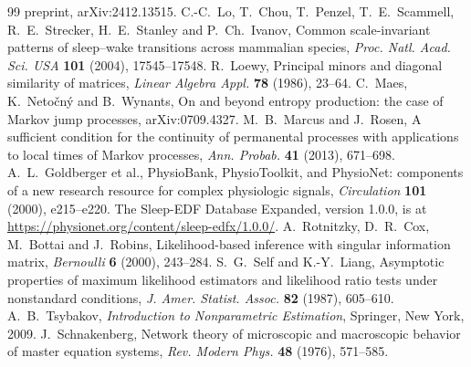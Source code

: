 \documentclass[11pt]{article}
\theoremstyle{definition}
\theoremstyle{remark}
\begin{document}
\begin{thebibliography}{99}
 preprint, arXiv:2412.13515.
 C.-C.~Lo, T.~Chou, T.~Penzel, T.~E.~Scammell, R.~E.~Strecker,
 H.~E.~Stanley and P.~Ch.~Ivanov, Common scale-invariant patterns of
 sleep--wake transitions across mammalian species, \emph{Proc. Natl. Acad. Sci.
 USA} \textbf{101} (2004), 17545--17548.
 R.~Loewy, Principal minors and diagonal similarity of
 matrices, \emph{Linear Algebra Appl.} \textbf{78} (1986), 23--64.
 C.~Maes, K.~Neto\v{c}n\'y and B.~Wynants, On and beyond
 entropy production: the case of Markov jump processes, arXiv:0709.4327.
 M.~B.~Marcus and J.~Rosen, A sufficient condition for the
 continuity of permanental processes with applications to local times of Markov
 processes, \emph{Ann. Probab.} \textbf{41} (2013), 671--698.
 A.~L.~Goldberger et al., PhysioBank, PhysioToolkit, and
 PhysioNet: components of a new research resource for complex physiologic
 signals, \emph{Circulation} \textbf{101} (2000), e215--e220. The Sleep-EDF
 Database Expanded, version 1.0.0, is at
 \url{https://physionet.org/content/sleep-edfx/1.0.0/}.
 A.~Rotnitzky, D.~R.~Cox, M.~Bottai and J.~Robins,
 Likelihood-based inference with singular information matrix, \emph{Bernoulli}
 \textbf{6} (2000), 243--284.
 S.~G.~Self and K.-Y.~Liang, Asymptotic properties of maximum
 likelihood estimators and likelihood ratio tests under nonstandard conditions,
 \emph{J. Amer. Statist. Assoc.} \textbf{82} (1987), 605--610.
 A.~B.~Tsybakov, \emph{Introduction to Nonparametric
 Estimation}, Springer, New York, 2009.
 J.~Schnakenberg, Network theory of microscopic and
 macroscopic behavior of master equation systems, \emph{Rev. Modern Phys.}
 \textbf{48} (1976), 571--585.
\end{thebibliography}
\end{document}
